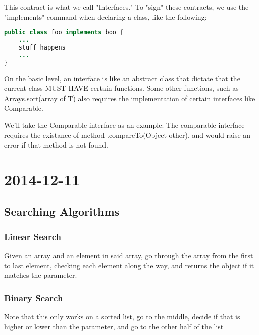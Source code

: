 \documentclass [12 pt, twoside] {article}
\begin{document}
This contract is what we call "Interfaces." To "sign" these contracts, we use the "implements"
command when declaring a class, like the following:
\begin{lstlisting}[language=java]
public class foo implements boo {
	...
	stuff happens
	...
}
\end{lstlisting}


On the basic level, an interface is like an abstract class that dictate that the current
class MUST HAVE certain functions. Some other functions, such as Arrays.sort(array of T)
also requires the implementation of certain interfaces like Comparable.


We'll take the Comparable interface as an example:
\newline
The comparable interface requires the existance of method .compareTo(Object other), and
would raise an error if that method is not found.

\section{2014-12-11}

\subsection{Searching Algorithms}
\subsubsection{Linear Search}


Given an array and an element in said array, go through the array from the first to last
element, checking each element along the way, and returns the object if it matches the parameter.
\subsubsection{Binary Search}


Note that this only works on a sorted list, go to the middle, decide if that is higher or lower
than the parameter, and go to the other half of the list
\end{document}
